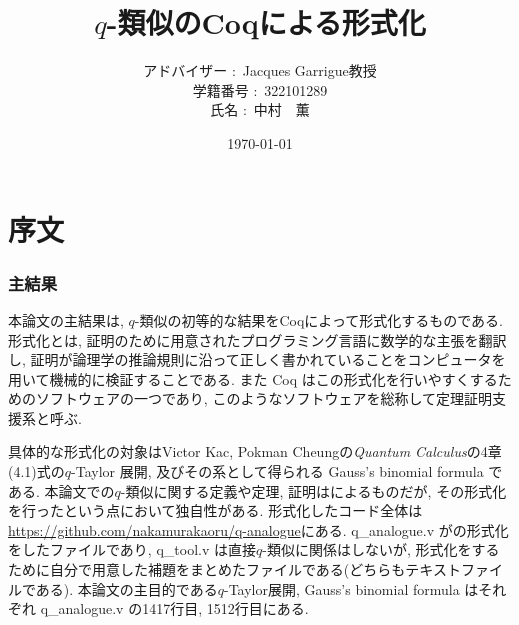 \documentclass[11pt]{jsreport}
\theoremstyle{mystyle}
\newcommand{\0}{\textbf{0}}
\begin{document}
\title{$q$-類似のCoqによる形式化}
\author{アドバイザー $\colon$ Jacques Garrigue教授\\
           学籍番号 $\colon$ 322101289\\
           氏名 $\colon$ 中村　薫}
\date{\today}
\maketitle
\tableofcontents
\section*{序文}
\subsubsection*{主結果}
本論文の主結果は, $q$-類似の初等的な結果をCoqによって形式化するものである. 
形式化とは, 証明のために用意されたプログラミング言語に数学的な主張を翻訳し, 証明が論理学の推論規則に沿って正しく書かれていることをコンピュータを用いて機械的に検証することである.   また Coq はこの形式化を行いやすくするためのソフトウェアの一つであり, このようなソフトウェアを総称して定理証明支援系と呼ぶ.

具体的な形式化の対象はVictor Kac, Pokman Cheungの{\it Quantum Calculus}\cite{Kac}の4章(4.1)式の$q$-Taylor 展開, 及びその系として得られる Gauss's binomial formula である. 
本論文での$q$-類似に関する定義や定理, 証明は\cite{Kac}によるものだが, その形式化を行ったという点において独自性がある. 形式化したコード全体は\url{https://github.com/nakamurakaoru/q-analogue}\cite{coq qana}にある. q\_analogue.v が\cite{Kac}の形式化をしたファイルであり, q\_tool.v は直接$q$-類似に関係はしないが, 形式化をするために自分で用意した補題をまとめたファイルである(どちらもテキストファイルである). 本論文の主目的である$q$-Taylor展開, Gauss's binomial formula はそれぞれ q\_analogue.v の1417行目, 1512行目にある. 
\end{document}
